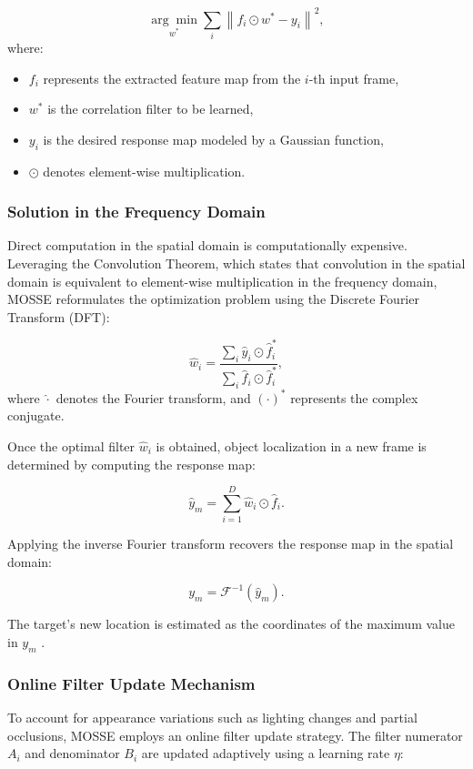 \begin{equation} \label{eq:mosse}
    \underset{w^*}{\arg\min} \sum_{i} \left\| f_i \odot w^* - y_i \right\|^2,
\end{equation}
where:
\begin{itemize}
    \item $f_i$ represents the extracted feature map from the $i$-th input frame,
    \item $w^*$ is the correlation filter to be learned,
    \item $y_i$ is the desired response map modeled by a Gaussian function,
    \item $\odot$ denotes element-wise multiplication.
\end{itemize}

\subsubsection{Solution in the Frequency Domain}
Direct computation in the spatial domain is computationally expensive. Leveraging the Convolution Theorem, which states that convolution in the spatial domain is equivalent to element-wise multiplication in the frequency domain, MOSSE reformulates the optimization problem using the Discrete Fourier Transform (DFT):

\begin{equation}
    \hat{w}_i = \frac{\sum_i \hat{y}_i \odot \hat{f}_i^*}{\sum_i \hat{f}_i \odot \hat{f}_i^*},
\end{equation}
where $\hat{\cdot}$ denotes the Fourier transform, and $(\cdot)^*$ represents the complex conjugate.

Once the optimal filter $\hat{w}_i$ is obtained, object localization in a new frame is determined by computing the response map:

\begin{equation}
    \hat{y}_m = \sum_{i=1}^{D} \hat{w}_i \odot \hat{f}_i.
\end{equation}

Applying the inverse Fourier transform recovers the response map in the spatial domain:

\begin{equation}
    y_m = \mathcal{F}^{-1}(\hat{y}_m).
\end{equation}

The target's new location is estimated as the coordinates of the maximum value in $y_m$ \cite{bolme2010visual}.

\subsubsection{Online Filter Update Mechanism}
To account for appearance variations such as lighting changes and partial occlusions, MOSSE employs an online filter update strategy. The filter numerator $A_i$ and denominator $B_i$ are updated adaptively using a learning rate $\eta$:

